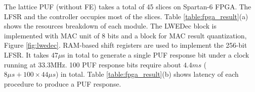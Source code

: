 


The lattice PUF (without FE) takes a total of 45 slices on Spartan-6 FPGA. The LFSR and the controller occupies most of the slices. Table %
\ref{table:fpga_result}(a) shows the resources breakdown of each module. 
The LWEDec block is implemented with MAC unit of 8 bits and a block for MAC result quantization, Figure \ref{fig:lwedec}.
RAM-based shift registers are used to implement the 256-bit LFSR. It takes $47\mu$s in total to generate a single PUF response bit under a clock running at 33.3MHz. 100 PUF response bits require about $4.4ms$ ($8\mu s + 100\times 44\mu s$) in total. Table %
\ref{table:fpga_result}(b) shows latency of each procedure to produce a PUF response.

